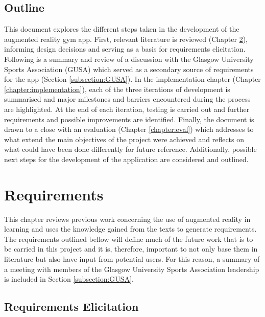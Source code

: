 \documentclass{l4proj}
\begin{document}
\section{Outline}
This document explores the different steps taken in the development of the augmented reality gym app. First, relevant literature is reviewed (Chapter \ref{chapter:reqs}), informing design decisions and serving as a basis for requirements elicitation. Following is a summary and review of a discussion with the Glasgow University Sports Association (GUSA) which served as a secondary source of requirements for the app (Section \ref{subsection:GUSA}). In the implementation chapter (Chapter \ref{chapter:implementation}), each of the three iterations of development is summarised and major milestones and barriers encountered during the process are highlighted. At the end of each iteration, testing is carried out and further requirements and possible improvements are identified. Finally, the document is drawn to a close with an evaluation (Chapter \ref{chapter:eval}) which addresses to what extend the main objectives of the project were achieved and reflects on what could have been done differently for future reference. Additionally, possible next steps for the development of the application are considered and outlined. 

\chapter{Requirements}
\label{chapter:reqs}

This chapter reviews previous work concerning the use of augmented reality in learning and uses the knowledge gained from the texts to generate requirements. The requirements outlined bellow will define much of the future work that is to be carried in this project and it is, therefore, important to not only base them in literature but also have input from potential users. For this reason, a summary of a meeting with members of the Glasgow University Sports Association leadership is included in Section \ref{subsection:GUSA}.

\section{Requirements Elicitation}
\label{sec:litrew}
\end{document}
